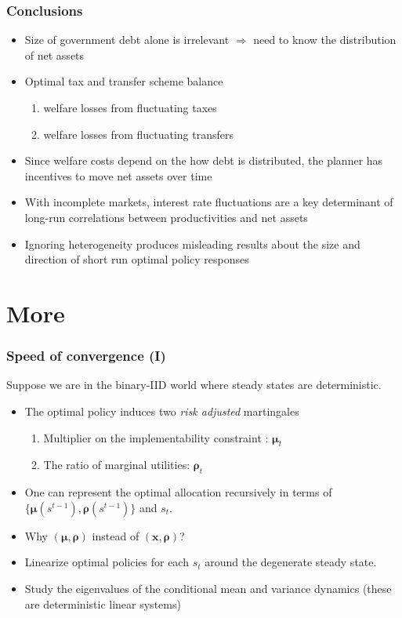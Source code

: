 \documentclass{beamer}
\begin{document}
\begin{frame}
 \frametitle{Conclusions}
\begin{itemize}
\item Size of government debt alone is irrelevant $\Longrightarrow $
need to know the  distribution of net assets
\item Optimal tax and transfer scheme balance
\begin{enumerate}
 \item welfare losses from fluctuating taxes
 \item welfare losses from fluctuating transfers
\end{enumerate}
\item Since welfare costs depend on the how debt is distributed, the planner has incentives to move  net assets over time
\item With incomplete markets, interest rate fluctuations are a  key determinant of  long-run correlations between productivities and net assets
\item Ignoring heterogeneity produces misleading results about the size and direction of short run optimal policy responses
\end{itemize}

\end{frame}
\appendix
\section{More}

\begin{frame}[label=convergence]
\frametitle{Speed of convergence  (I) }
Suppose we are in the binary-IID world where steady states are deterministic.


\begin{itemize}
\item The optimal policy induces two \emph{risk adjusted} martingales 
\begin{enumerate}
\item Multiplier on the implementability constraint : $\bm{\mu}_{t}$
\item The ratio of marginal utilities: $\bm{\rho}_{t}$
\end{enumerate}
 \item One can represent the optimal allocation recursively in terms of $\{\bm \mu(s^{t-1}),\bm \rho(s^{t-1})\}$ and $s_t$.
\item Why $(\bm{\mu},\bm{\rho})$ instead of $(\bm{x},\bm{\rho})$?
\item Linearize optimal policies for each $s_t$ around the degenerate steady state.
\item Study the eigenvalues of the conditional mean and variance dynamics (these are deterministic linear systems)
\end{itemize}

\end{frame}
\end{document}
